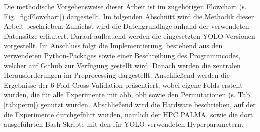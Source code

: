 Die methodische Vorgehensweise dieser Arbeit ist im zugehörigen Flowchart (s. Fig. \ref{fig:Flowchart}) dargestellt. Im folgenden Abschnitt wird die Methodik dieser Arbeit beschrieben. Zunächst wird die Datengrundlage anhand der verwendeten Datensätze erläutert. Darauf aufbauend werden die eingesetzten \acrshort{YOLO}-Versionen vorgestellt. Im Anschluss folgt die Implementierung, bestehend aus den verwendeten Python-Packages sowie einer Beschreibung des Programmcodes, welcher auf Github \cite{Github_timo} zur Verfügung gestellt wird. Danach werden die zentralen Herausforderungen im Preprocessing dargestellt. Anschließend werden die Ergebnisse der 6-Fold-Cross-Validation präsentiert, wobei eigene Folds erstellt wurden, die für alle Experimente mit \acrshort{abb}, \acrshort{obb} sowie den Permutationen (s. Tab. \ref{tab:perm}) genutzt wurden. Abschließend wird die Hardware beschrieben, auf der die Experimente durchgeführt wurden, nämlich der \acrlong{HPC} \acrshort{PALMA}, sowie die dort ausgeführten Bash-Skripte mit den für \acrshort{YOLO} verwendeten Hyperparametern.  


